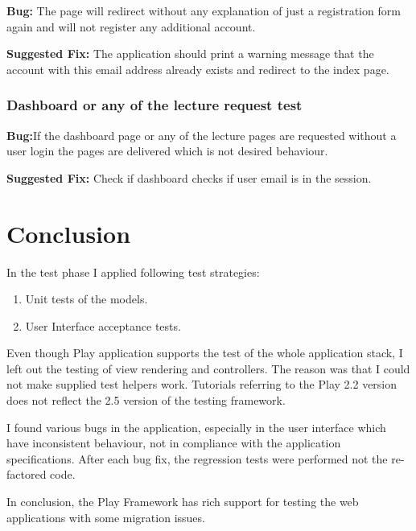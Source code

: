 \documentclass[12pt,twoside,a4paper]{report}
\begin{document}
\textbf{Bug:} The page will redirect without any explanation of just a registration form again and will not register any additional account.

\textbf{Suggested Fix:} The application should print a warning message that the account with this email address already exists and redirect to the index page.

\subsubsection{Dashboard or any of the lecture request test}\label{5.3.1.2}

\textbf{Bug:}If the dashboard page or any of the lecture pages are requested without a user login the pages are delivered which is not desired behaviour.

\textbf{Suggested Fix:} Check if dashboard checks if user email is in the session.

\section{Conclusion}\label{5.4}

In the test phase I applied following test strategies:
\begin{enumerate} \item Unit tests of the models.
\item User Interface acceptance tests.
\end{enumerate}
Even though Play application supports the test of the whole application stack, I left out the testing of view rendering and controllers. The reason was that I could not make supplied test helpers work. Tutorials referring to the Play 2.2 version does not reflect the 2.5 version of the testing framework.

I found various bugs in the application, especially in the user interface which have inconsistent behaviour, not in compliance with the application specifications. After each bug fix, the regression tests were performed not the re-factored code.

In conclusion, the Play Framework has rich support for testing the web applications with some migration issues.









\end{document}
